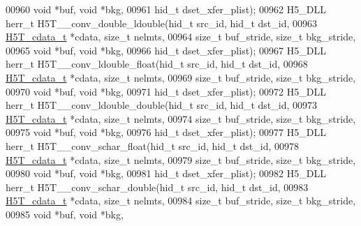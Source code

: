 \begin{DoxyCode}
00960                                      \textcolor{keywordtype}{void} *buf, \textcolor{keywordtype}{void} *bkg,
00961                                      hid\_t dset\_xfer\_plist);
00962 H5\_DLL herr\_t H5T\_\_conv\_double\_ldouble(hid\_t src\_id, hid\_t dst\_id,
00963                      \hyperlink{struct_h5_t__cdata__t}{H5T\_cdata\_t} *cdata, \textcolor{keywordtype}{size\_t} nelmts,
00964                      \textcolor{keywordtype}{size\_t} buf\_stride, \textcolor{keywordtype}{size\_t} bkg\_stride,
00965                                      \textcolor{keywordtype}{void} *buf, \textcolor{keywordtype}{void} *bkg,
00966                                      hid\_t dset\_xfer\_plist);
00967 H5\_DLL herr\_t H5T\_\_conv\_ldouble\_float(hid\_t src\_id, hid\_t dst\_id,
00968                      \hyperlink{struct_h5_t__cdata__t}{H5T\_cdata\_t} *cdata, \textcolor{keywordtype}{size\_t} nelmts,
00969                      \textcolor{keywordtype}{size\_t} buf\_stride, \textcolor{keywordtype}{size\_t} bkg\_stride,
00970                                      \textcolor{keywordtype}{void} *buf, \textcolor{keywordtype}{void} *bkg,
00971                                      hid\_t dset\_xfer\_plist);
00972 H5\_DLL herr\_t H5T\_\_conv\_ldouble\_double(hid\_t src\_id, hid\_t dst\_id,
00973                      \hyperlink{struct_h5_t__cdata__t}{H5T\_cdata\_t} *cdata, \textcolor{keywordtype}{size\_t} nelmts,
00974                      \textcolor{keywordtype}{size\_t} buf\_stride, \textcolor{keywordtype}{size\_t} bkg\_stride,
00975                                      \textcolor{keywordtype}{void} *buf, \textcolor{keywordtype}{void} *bkg,
00976                                      hid\_t dset\_xfer\_plist);
00977 H5\_DLL herr\_t H5T\_\_conv\_schar\_float(hid\_t src\_id, hid\_t dst\_id,
00978                      \hyperlink{struct_h5_t__cdata__t}{H5T\_cdata\_t} *cdata, \textcolor{keywordtype}{size\_t} nelmts,
00979                      \textcolor{keywordtype}{size\_t} buf\_stride, \textcolor{keywordtype}{size\_t} bkg\_stride,
00980                                      \textcolor{keywordtype}{void} *buf, \textcolor{keywordtype}{void} *bkg,
00981                                      hid\_t dset\_xfer\_plist);
00982 H5\_DLL herr\_t H5T\_\_conv\_schar\_double(hid\_t src\_id, hid\_t dst\_id,
00983                      \hyperlink{struct_h5_t__cdata__t}{H5T\_cdata\_t} *cdata, \textcolor{keywordtype}{size\_t} nelmts,
00984                      \textcolor{keywordtype}{size\_t} buf\_stride, \textcolor{keywordtype}{size\_t} bkg\_stride,
00985                                      \textcolor{keywordtype}{void} *buf, \textcolor{keywordtype}{void} *bkg,

\end{DoxyCode}
